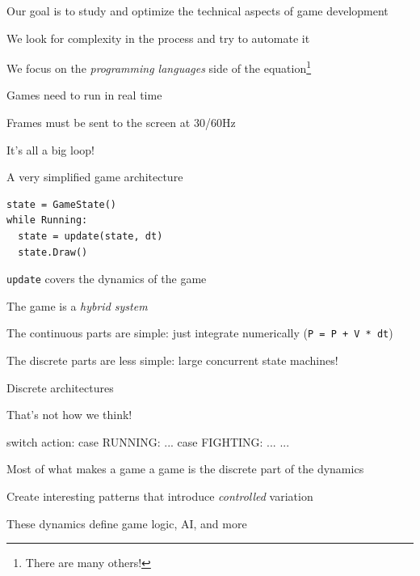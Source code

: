 \documentclass{beamer}
\begin{document}
\begin{slide}{
\item Our goal is to study and optimize the technical aspects of game development
\item We look for complexity in the process and try to automate it
\item We focus on the \textit{programming languages} side of the equation\footnote{There are many others!}
}\end{slide}

\begin{slide}{
\item Games need to run in real time
\item Frames must be sent to the screen at 30/60Hz
\item It's all a big loop!
}\end{slide}

\begin{frame}[fragile]{A very simplified game architecture}
\begin{lstlisting}
state = GameState()
while Running:
  state = update(state, dt)
  state.Draw()
\end{lstlisting}
\end{frame}

\begin{slide}{
\item \texttt{update} covers the dynamics of the game
\item The game is a \textit{hybrid system}
\item The continuous parts are simple: just integrate numerically (\texttt{P = P + V * dt})
\item The discrete parts are less simple: large concurrent state machines!
}\end{slide}

\begin{frame}[fragile]{Discrete architectures}
\begin{codewithblock}{\pause \item That's not how we think!}
switch action:
  case RUNNING:
    ...
  case FIGHTING:
    ...
  ...
\end{codewithblock}
\end{frame}

\begin{slide}{
\item Most of what makes a game a game is the discrete part of the dynamics
\item Create interesting patterns that introduce \textit{controlled} variation
\item These dynamics define game logic, AI, and more
}\end{slide}
\end{document}
